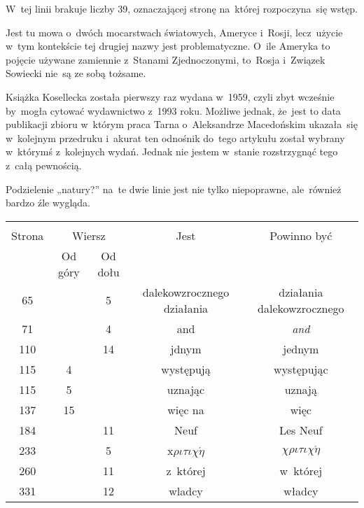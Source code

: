 \documentclass[a4paper,11pt]{article}
\begin{document}

\start {} W~tej linii brakuje liczby 39, oznaczającej stronę
na~której rozpoczyna~się wstęp.

\vspace{\spaceFour}


\start {} Jest tu mowa o~dwóch mocarstwach światowych, Ameryce
i~Rosji, lecz~użycie w~tym kontekście tej drugiej nazwy jest
problematyczne. O~ile Ameryka to pojęcie używane zamiennie z~Stanami
Zjednoczonymi, to~Rosja i~Związek Sowiecki nie~są ze sobą tożsame.

\vspace{\spaceFour}


\start {} Książka Kosellecka została pierwszy raz wydana
w~1959, czyli zbyt wcześnie by~mogła cytować wydawnictwo z~1993 roku.
Możliwe jednak, że~jest to data publikacji zbioru w~którym praca Tarna
o~Aleksandrze Macedońskim ukazała~się w~kolejnym przedruku i~akurat
ten odnośnik do~tego artykułu został wybrany w~którymś z~kolejnych
wydań. Jednak nie jestem w~stanie rozstrzygnąć tego z~całą pewnością.

\vspace{\spaceFour}


\start {} Podzielenie „natury?” na~te dwie linie
jest nie tylko niepoprawne, ale~również bardzo źle wygląda.

\vspace{\spaceFour}






\begin{center}

  \begin{tabular}{|c|c|c|c|c|}
    \hline
    & \multicolumn{2}{c|}{} & & \\
    Strona & \multicolumn{2}{c|}{Wiersz} & Jest
                              & Powinno być \\ \cline{2-3}
    & Od góry & Od dołu & & \\
    \hline
    65  & &  5 & dalekowzrocznego działania & działania dalekowzrocznego \\
    71  & &  4 & and & \textit{and} \\
    110 & & 14 & jdnym & jednym \\
    115 &  4 & & występują & występując \\
    115 &  5 & & uznając & uznają \\
    137 & 15 & & więc na & więc \\
    184 & & 11 & Neuf & Les Neuf \\
    233 & &  5 & x$\rho\iota\tau\iota\chi\acute{\eta}$ & $\chi\rho\iota\tau\iota\chi\acute{\eta}$ \\
    260 & & 11 & z~której & w~której \\
    331 & & 12 & wladcy & władcy \\
    \hline
  \end{tabular}

\end{center}
\end{document}
